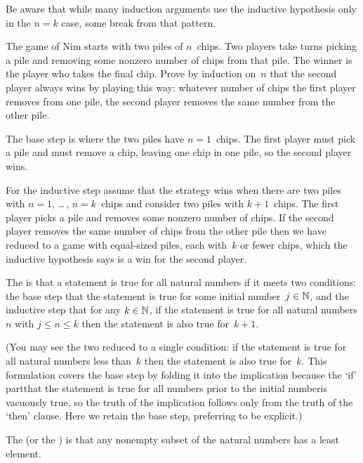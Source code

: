 \documentclass{ibl}
\begin{document}
\noindent
Be aware that while many induction arguments use the inductive 
hypothesis only in the $n=k$ case,
some break from that pattern.

\begin{ex}
The game of Nim starts with two piles of $n$~chips.
Two players take turns picking a pile and removing 
some nonzero number of chips from that pile. 
The winner is the player who takes the final chip.
Prove by induction on~$n$ that the second player always wins by
playing this way: whatever number of chips the first player removes
from one pile, the second player removes the same number from the other pile.
\begin{ans}
The base step is where the two piles have $n=1$~chips.
The first player must pick a pile and must remove a chip, leaving one chip
in one pile, so the second player wins.

For the inductive step assume that the strategy wins when there are two piles
with $n=1$, \ldots\,, $n=k$~chips and consider two piles with
$k+1$~chips.
The first player picks a pile and removes some nonzero number of chips.
If the second player removes the same number of chips from the other
pile then we have reduced to a game with equal-sized piles, each
with~$k$ or fewer chips, which the inductive hypothesis says
is a win for the second player.  
\end{ans}
\end{ex}

\begin{df}
The  is that a
statement is true for all natural numbers if it
meets two conditions: the base step that the statement is true for some
initial number~$j\in\mathbb{N}$,
and the inductive step that for any $k\in\mathbb{N}$, 
if the statement is true for 
all natural numbers $n$ with $j\leq n\leq k$ then the
statement is also true for~$k+1$.  
\end{df}

\noindent (You may see the two reduced to a single condition: 
if the statement is true for all natural numbers less than~$k$
then the statement is also true for~$k$.
This formulation covers the base step by folding it into the 
implication because
the `if' part\Dash that the statement is true for all numbers prior to
the initial number\Dash is vacuously true, so the truth of the implication
follows only from the truth of the `then' clause.
Here we retain the base step, preferring to be explicit.)

\begin{df}
The  
(or the )
is that any nonempty 
subset of the natural
numbers has a least element.  
\end{df}
\end{document}
